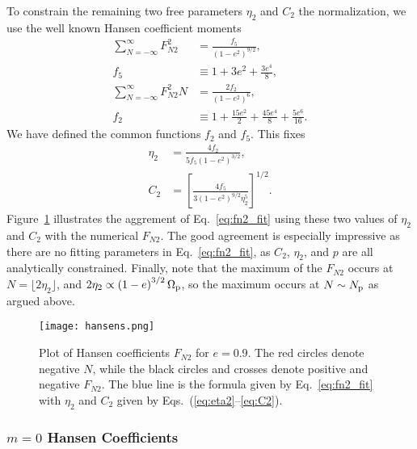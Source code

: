 \documentclass[
        fleqn,
        usenatbib,
    ]{mnras}
\newcommand*{\p}[1]{\left(#1\right)}
\newcommand*{\s}[1]{\left[#1\right]}
\begin{document}
To constrain the remaining two free parameters $\eta_2$ and $C_2$ the
normalization, we use the well known Hansen coefficient moments
\citep{hut81}
\begin{align}
    \sum\limits_{N = -\infty}^\infty F_{N2}^2 &= \frac{f_5}{\p{1 - e^2}^{9/2}},
        \\
    f_5 &\equiv 1 + 3e^2 + \frac{3e^4}{8},\\
    \sum\limits_{N = -\infty}^\infty F_{N2}^2N
        &= \frac{2f_2}{\p{1 - e^2}^6},\\
    f_2 &\equiv 1 + \frac{15e^2}{2}
            + \frac{45 e^4}{8} + \frac{5e^6}{16}.
\end{align}
We have defined the common functions $f_2$ and $f_5$. This fixes
\begin{align}
    \eta_2 &= \frac{4f_2}{5f_5\p{1 - e^2}^{3/2}},\label{eq:eta2}\\
    C_2 &= \s{\frac{4f_5}{3\p{1 - e^2}^{9/2}\eta_2^5}}^{1/2}.\label{eq:C2}
\end{align}
Figure~\ref{fig:hansens} illustrates the aggrement of Eq.~\eqref{eq:fn2_fit}
using these two values of $\eta_2$ and $C_2$ with the numerical $F_{N2}$. The
good agreement is especially impressive as there are no fitting parameters in
Eq.~\eqref{eq:fn2_fit}, as $C_2$, $\eta_2$, and $p$ are all analytically
constrained. Finally, note that the maximum of the $F_{N2}$ occurs at $N =
\lfloor 2\eta_2 \rfloor$, and $2\eta_2 \propto \p{1 - e}^{3/2} \Omega_{\rm p}$,
so the maximum occurs at $N \sim N_{\rm p}$ as argued above.
\begin{figure}
    \centering
    \texttt{[image: hansens.png]}
    \caption{Plot of Hansen coefficients $F_{N2}$ for $e = 0.9$. The red circles
    denote negative $N$, while the black circles and crosses denote positive and
    negative $F_{N2}$. The blue line is the formula given by
    Eq.~\eqref{eq:fn2_fit} with $\eta_2$ and $C_2$ given by
    Eqs.~(\ref{eq:eta2}--\ref{eq:C2}). }\label{fig:hansens}
\end{figure}

\subsubsection{$m = 0$ Hansen Coefficients}
\end{document}
